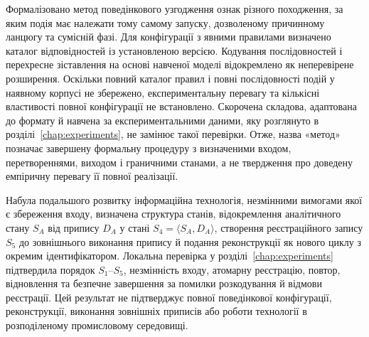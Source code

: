 Формалізовано метод поведінкового узгодження ознак різного походження, за яким подія має належати тому самому запуску, дозволеному причинному ланцюгу та сумісній фазі. Для конфігурації з явними правилами визначено каталог відповідностей із установленою версією. Кодування послідовностей і перехресне зіставлення на основі навченої моделі відокремлено як неперевірене розширення. Оскільки повний каталог правил і повні послідовності подій у наявному корпусі не збережено, експериментальну перевагу та кількісні властивості повної конфігурації не встановлено. Скорочена складова, адаптована до формату й навчена за експериментальними даними, яку розглянуто в розділі~\ref{chap:experiments}, не замінює такої перевірки. Отже, назва «метод» позначає завершену формальну процедуру з визначеними входом, перетвореннями, виходом і граничними станами, а не твердження про доведену емпіричну перевагу її повної реалізації.

Набула подальшого розвитку інформаційна технологія, незмінними вимогами якої є збереження входу, визначена структура станів, відокремлення аналітичного стану $S_A$ від припису $D_A$ у стані $S_4=\langle S_A,D_A\rangle$, створення реєстраційного запису $S_5$ до зовнішнього виконання припису й подання реконструкції як нового циклу з окремим ідентифікатором. Локальна перевірка у розділі~\ref{chap:experiments} підтвердила порядок $S_1$--$S_5$, незмінність входу, атомарну реєстрацію, повтор, відновлення та безпечне завершення за помилки розкодування й відмови реєстрації. Цей результат не підтверджує повної поведінкової конфігурації, реконструкції, виконання зовнішніх приписів або роботи технології в розподіленому промисловому середовищі.
